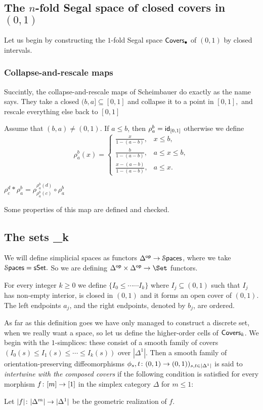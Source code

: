 \subsection{The $n$-fold Segal space of closed covers in $(0,1)$}
Let us begin by constructing the $1$-fold Segal space ${\sf Covers}_\bullet$ of $(0,1)$ by closed intervals.

\subsubsection{Collapse-and-rescale maps}
Succintly, the collapse-and-rescale maps of Scheimbauer do exactly as the name says. They take a closed $(b,a]\subseteq [0,1]$ and collapse it to a point in $[0,1],$ and rescale everything else back to $[0,1]$
\begin{definition}
Assume that $(b,a)\neq (0,1)$. If $a\leq b$, then $\rho^b_a=\operatorname{{\sf id}}_{[0,1]}$ otherwise we define \[\rho^b_a(x) = \begin{cases}\frac{x}{1-(a-b)}, & x\leq b, \\
\frac{b}{1-(a-b)}, & a\leq x \leq b, \\
\frac{x-(a-b)}{1-(a-b)}, & a\leq x.\end{cases}\]
\end{definition}
\begin{observation}
$\rho^d_c\ast\rho^b_a=\rho^{\rho^b_a(d)}_{\rho^b_a(c)}\circ \rho^b_a$
\end{observation}
Some properties of this map are defined and checked.
\subsection{The sets \Covers_k}
We will define simplicial spaces as functors $\Delta^{\operatorname{\mathsf{op}}}\rightarrow \operatorname{\mathcal S\mathsf{paces}}$, where we take $\operatorname{\mathcal S\mathsf{paces}}= {\sf sSet}.$
So we are defining $\Delta^{\op}\times \Delta^{\op}\ra \Set$ functors.

For every integer $k\geq 0$ we define $\{I_0\leq \cdots \cdots I_k\}$ where $I_j\subseteq (0,1)$ such that $I_j$ has non-empty interior, is closed in $(0,1)$ and it forms an open cover of $(0,1).$ The left endpoints $a_j$, and the right endpoints, denoted by $b_j$, are ordered.

As far as this definition goes we have only managed to construct a discrete set, when we really want a space, so let us define the higher-order cells of $\operatorname{{\sf Covers}}_k$. We begin with the $1$-simplices: these consist of a smooth family of covers $(I_0(s)\leq I_1(s)\leq \cdots \leq I_k(s))$ over $|\Delta^1|$. Then a smooth family of orientation-preserving diffeomorphisms $\phi_s,t\colon (0,1)\rightarrow (0,1))_{s,t\in |\Delta^1|}$ is said to \textit{intertwine with the composed covers} if the following condition is satisfied for every morphism $f\colon [m]\rightarrow [1]$ in the simplex category $\Delta$ for $m\leq 1:$

Let $|f|\colon |\Delta^m|\rightarrow |\Delta^1|$ be the geometric realization of $f.$
